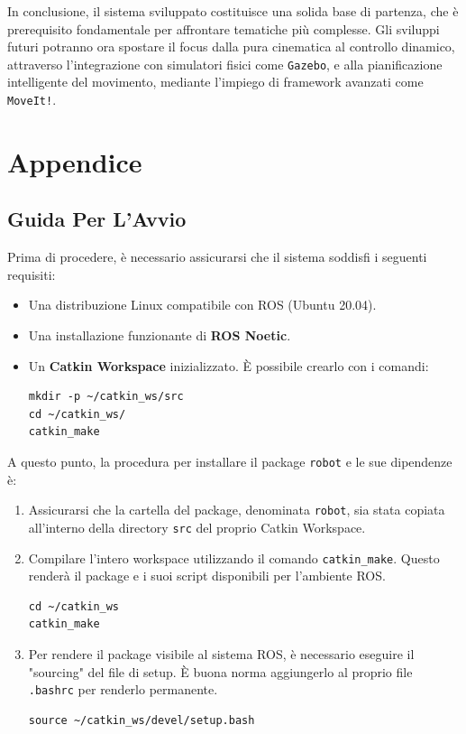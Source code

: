 \documentclass[11pt, a4paper]{report}
\begin{document}
In conclusione, il sistema sviluppato costituisce una solida base di partenza, che è prerequisito fondamentale per affrontare tematiche più complesse. Gli sviluppi futuri potranno ora spostare il focus dalla pura cinematica al controllo dinamico, attraverso l'integrazione con simulatori fisici come \texttt{Gazebo}, e alla pianificazione intelligente del movimento, mediante l'impiego di framework avanzati come \texttt{MoveIt!}.

\appendix

\chapter{Appendice}
\section{Guida Per L'Avvio}
\label{sec:guida_avvio}

Prima di procedere, è necessario assicurarsi che il sistema soddisfi i seguenti requisiti:
\begin{itemize}
    \item Una distribuzione Linux compatibile con ROS (Ubuntu 20.04).
    \item Una installazione funzionante di \textbf{ROS Noetic}.
    \item Un \textbf{Catkin Workspace} inizializzato. È possibile crearlo con i comandi:
    \begin{lstlisting}[style=bashStyle]
mkdir -p ~/catkin_ws/src
cd ~/catkin_ws/
catkin_make
    \end{lstlisting}
\end{itemize}

A questo punto, la procedura per installare il package \texttt{robot} e le sue dipendenze è:

\begin{enumerate}
    \item Assicurarsi che la cartella del package, denominata \texttt{robot}, sia stata copiata all'interno della directory \texttt{src} del proprio Catkin Workspace.

    \item Compilare l'intero workspace utilizzando il comando \texttt{catkin\_make}. Questo renderà il package e i suoi script disponibili per l'ambiente ROS.
    \begin{lstlisting}[style=bashStyle]
cd ~/catkin_ws
catkin_make
    \end{lstlisting}

    \item Per rendere il package visibile al sistema ROS, è necessario eseguire il "sourcing" del file di setup. È buona norma aggiungerlo al proprio file \texttt{.bashrc} per renderlo permanente.
    \begin{lstlisting}[style=bashStyle]
source ~/catkin_ws/devel/setup.bash
    \end{lstlisting}
\end{enumerate}
\end{document}
